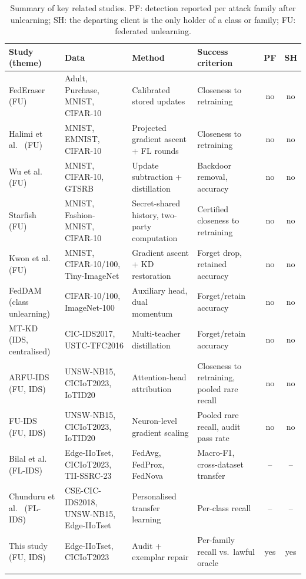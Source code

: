 \documentclass[pdflatex,sn-mathphys-num,iicol]{sn-jnl}
\begin{document}
\begin{table}[t]
\caption{Summary of key related studies. PF: detection reported per attack family after unlearning; SH: the departing client is the only holder of a class or family; FU: federated unlearning.}\label{tab:related}
\scriptsize
\setlength{\tabcolsep}{3pt}
\begin{tabular*}{\textwidth}{@{\extracolsep\fill}>{\raggedright\arraybackslash}p{2.9cm}>{\raggedright\arraybackslash}p{3.5cm}>{\raggedright\arraybackslash}p{3.5cm}>{\raggedright\arraybackslash}p{3.5cm}cc@{}}
\toprule
Study (theme) & Data & Method & Success criterion & PF & SH \\
\midrule
FedEraser~\cite{liu2021federaser} (FU) & Adult, Purchase, MNIST, CIFAR-10 & Calibrated stored updates & Closeness to retraining & no & no \\
Halimi et al.~\cite{halimi2022} (FU) & MNIST, EMNIST, CIFAR-10 & Projected gradient ascent + FL rounds & Closeness to retraining & no & no \\
Wu et al.~\cite{wu2022distill} (FU) & MNIST, CIFAR-10, GTSRB & Update subtraction + distillation & Backdoor removal, accuracy & no & no \\
Starfish~\cite{liu2025starfish} (FU) & MNIST, Fashion-MNIST, CIFAR-10 & Secret-shared history, two-party computation & Certified closeness to retraining & no & no \\
Kwon et al.~\cite{kwon2026} (FU) & MNIST, CIFAR-10/100, Tiny-ImageNet & Gradient ascent + KD restoration & Forget drop, retained accuracy & no & no \\
FedDAM~\cite{patra2026} (class unlearning) & CIFAR-10/100, ImageNet-100 & Auxiliary head, dual momentum & Forget/retain accuracy & no & no \\
MT-KD~\cite{shen2026mtkd} (IDS, centralised) & CIC-IDS2017, USTC-TFC2016 & Multi-teacher distillation & Forget/retain accuracy & no & no \\
ARFU-IDS~\cite{yang2026arfu} (FU, IDS) & UNSW-NB15, CICIoT2023, IoTID20 & Attention-head attribution & Closeness to retraining, pooled rare recall & no & no \\
FU-IDS~\cite{wang2026fuids} (FU, IDS) & UNSW-NB15, CICIoT2023, IoTID20 & Neuron-level gradient scaling & Pooled rare recall, audit pass rate & no & no \\
Bilal et al.~\cite{bilal2026} (FL-IDS) & Edge-IIoTset, CICIoT2023, TII-SSRC-23 & FedAvg, FedProx, FedNova & Macro-F1, cross-dataset transfer & -- & -- \\
Chunduru et al.~\cite{chunduru2025} (FL-IDS) & CSE-CIC-IDS2018, UNSW-NB15, Edge-IIoTset & Personalised transfer learning & Per-class recall & -- & -- \\
\midrule
This study (FU, IDS) & Edge-IIoTset, CICIoT2023 & Audit + exemplar repair & Per-family recall vs.\ lawful oracle & yes & yes \\
\botrule
\end{tabular*}
\end{table}
\end{document}
